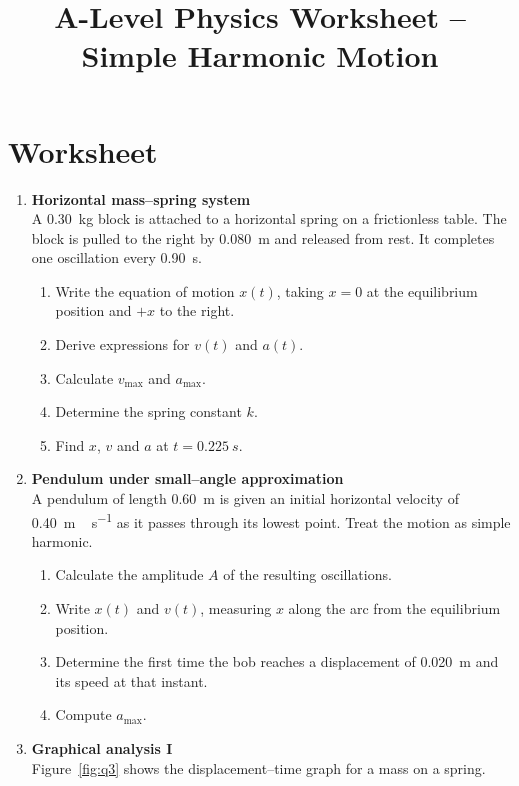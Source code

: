 \documentclass[12pt]{article}
\begin{document}
\title{A-Level Physics Worksheet -- Simple Harmonic Motion}
\date{}
\maketitle

\section*{Worksheet}

\begin{enumerate}[label=\textbf{Q\arabic*.}]
\item \textbf{Horizontal mass--spring system}\\
A \SI{0.30}{kg} block is attached to a horizontal spring on a frictionless table. The block is pulled to the right by \SI{0.080}{m} and released from rest. It completes one oscillation every \SI{0.90}{s}.
\begin{enumerate}[label=(\alph*)]
\item Write the equation of motion $x(t)$, taking $x=0$ at the equilibrium position and $+x$ to the right.
\item Derive expressions for $v(t)$ and $a(t)$.
\item Calculate $v_\text{max}$ and $a_\text{max}$.
\item Determine the spring constant $k$.
\item Find $x$, $v$ and $a$ at $t=\SI{0.225}{s}$.
\end{enumerate}

\item \textbf{Pendulum under small--angle approximation}\\
A pendulum of length \SI{0.60}{m} is given an initial horizontal velocity of \SI{0.40}{m\,s^{-1}} as it passes through its lowest point. Treat the motion as simple harmonic.
\begin{enumerate}[label=(\alph*)]
\item Calculate the amplitude $A$ of the resulting oscillations.
\item Write $x(t)$ and $v(t)$, measuring $x$ along the arc from the equilibrium position.
\item Determine the first time the bob reaches a displacement of \SI{0.020}{m} and its speed at that instant.
\item Compute $a_\text{max}$.
\end{enumerate}

\clearpage
\item \textbf{Graphical analysis I}\\
Figure~\ref{fig:q3} shows the displacement--time graph for a mass on a spring.


\end{enumerate}
\end{document}
